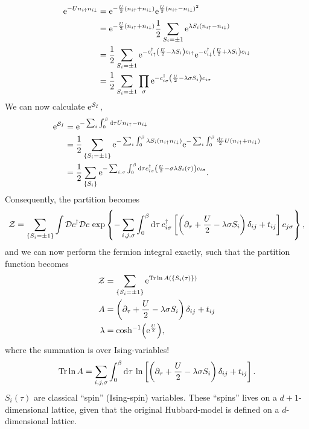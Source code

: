 \begin{align*}
\mathrm{e}^{-Un_{i\uparrow}n_{i\downarrow}} &=\mathrm{e}^{-\frac U2(n_{i\uparrow}+n_{i\downarrow})}
\mathrm{e}^{\frac U2(n_{i\uparrow}-n_{i\downarrow})^2} \\
&= \mathrm{e}^{-\frac U2(n_{i\uparrow}+n_{i\downarrow})}\frac12\sum_{S_i=\pm 1}\mathrm{e}^{\lambda S_i(n_{i\uparrow}-n_{i\downarrow})}\\
&=\frac12\sum_{S_i=\pm 1}\mathrm{e}^{-c_{i\uparrow}^\dagger\left(\frac U2 - \lambda S_i\right)c_{i\uparrow}}
\mathrm{e}^{-c_{i\downarrow}^\dagger\left(\frac U2 + \lambda S_i\right)c_{i\downarrow}}\\
&= \frac12\sum_{S_i=\pm1}\prod_\sigma\mathrm{e}^{-c_{i\sigma}^\dagger\left(\frac U2-\lambda\sigma S_i\right)c_{i\sigma}}
\end{align*}
We can now calculate \(\mathrm{e}^{\mathcal{S}_I}\), 
\begin{align*}
\mathrm{e}^{\mathcal{S}_I} &= \mathrm{e}^{-\sum_i\int_0^\beta\dd\tau Un_{i\uparrow}-n_{i\downarrow}} \\
&= \frac12\sum_{\{S_i = \pm1\}}\mathrm{e}^{-\sum_i\int_0^\beta\lambda S_i(n_{i\uparrow}n_{i\downarrow})}\mathrm{e}^{-\sum_i\int_0^\beta\frac{\dd\tau}{2}U(n_{i\uparrow}+n_{i\downarrow})}\\
&= \frac12\sum_{\{S_i\}}\mathrm{e}^{-\sum_{i,\sigma}\int_0^\beta\dd\tau c_{i\sigma}^\dagger\left(\frac U2-\sigma\lambda S_i(\tau)\right)c_{i\sigma}}.
\end{align*}
Consequently, the partition becomes
\begin{equation}
\mathcal{Z} = \sum_{\{S_i=\pm1\}}\int\mathcal{D} c^\dagger\mathcal{D} c\,\exp\left\{-\sum_{i,j,\sigma}\int_0^\beta\dd\tau\,c_{i\sigma}^\dagger\left[\left(\partial_{\tau}+\frac U2-\lambda\sigma S_i\right)\delta_{ij}+t_{ij}\right]c_{j\sigma}\right\},
\end{equation}
and we can now perform the fermion integral exactly, such that the partition function becomes
\begin{align}
\mathcal{Z} &= \sum_{\{S_i = \pm1\}}\mathrm{e}^{\Tr\ln A(\{S_i(\tau)\})}\\
A &= \left(\partial_{\tau}+\frac U2-\lambda\sigma S_i\right)\delta_{ij}+t_{ij}\\
\lambda &= \cosh[-1](\mathrm{e}^{\frac U2}),
\end{align}
where the summation is over Ising-variables!
\begin{equation}
\Tr\ln A = \sum_{i,j,\sigma}\int_0^\beta\dd\tau\,\ln\left[\left(\partial_{\tau}+\frac U2-\lambda\sigma S_i\right)\delta_{ij}+t_{ij}\right].
\end{equation}
\(S_i(\tau)\) are classical ``spin'' (Ising-spin) variables. These ``spins'' lives on a $d+1$-dimensional lattice, given that the original Hubbard-model is defined on a $d$-dimensional lattice. 

